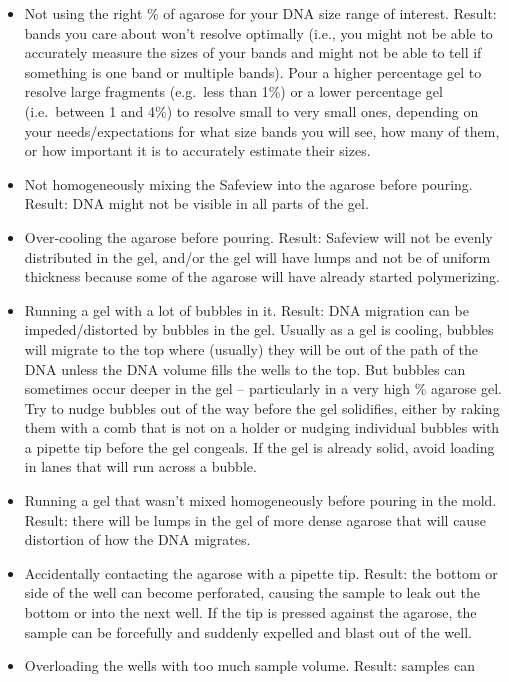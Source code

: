 \documentclass[
  letterpaper,
  DIV=11,
  numbers=noendperiod]{scrreprt}
\begin{document}
\begin{itemize}
\begin{tcolorbox}
  \end{tcolorbox}
\item
  Not using the right \% of agarose for your DNA size range of interest.
  Result: bands you care about won't resolve optimally (i.e., you might
  not be able to accurately measure the sizes of your bands and might
  not be able to tell if something is one band or multiple bands). Pour
  a higher percentage gel to resolve large fragments (e.g.~less than
  1\%) or a lower percentage gel (i.e.~between 1 and 4\%) to resolve
  small to very small ones, depending on your needs/expectations for
  what size bands you will see, how many of them, or how important it is
  to accurately estimate their sizes.
\item
  Not homogeneously mixing the Safeview into the agarose before pouring.
  Result: DNA might not be visible in all parts of the gel.
\item
  Over-cooling the agarose before pouring. Result: Safeview will not be
  evenly distributed in the gel, and/or the gel will have lumps and not
  be of uniform thickness because some of the agarose will have already
  started polymerizing.
\item
  Running a gel with a lot of bubbles in it. Result: DNA migration can
  be impeded/distorted by bubbles in the gel. Usually as a gel is
  cooling, bubbles will migrate to the top where (usually) they will be
  out of the path of the DNA unless the DNA volume fills the wells to
  the top. But bubbles can sometimes occur deeper in the gel --
  particularly in a very high \% agarose gel. Try to nudge bubbles out
  of the way before the gel solidifies, either by raking them with a
  comb that is not on a holder or nudging individual bubbles with a
  pipette tip before the gel congeals. If the gel is already solid,
  avoid loading in lanes that will run across a bubble.
\item
  Running a gel that wasn't mixed homogeneously before pouring in the
  mold. Result: there will be lumps in the gel of more dense agarose
  that will cause distortion of how the DNA migrates.
\item
  Accidentally contacting the agarose with a pipette tip. Result: the
  bottom or side of the well can become perforated, causing the sample
  to leak out the bottom or into the next well. If the tip is pressed
  against the agarose, the sample can be forcefully and suddenly
  expelled and blast out of the well.
\item
  Overloading the wells with too much sample volume. Result: samples can

\end{itemize}
\end{document}
